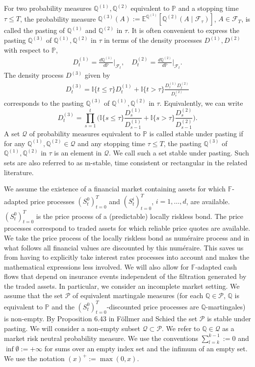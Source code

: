 \documentclass[11pt,a4paper]{article}
\newcommand{\E}{\mathbb{E}}
\renewcommand{\P}{\mathbb{P}}
\newcommand{\Q}{\mathbb{Q}}
\newcommand{\calF}{\mathcal{F}}
\newcommand{\filF}{\mathbb{F}}
\newcommand{\calQ}{\mathcal{Q}}
\newcommand{\indic}{\mathbb{I}}
\begin{document}
For two probability measures $\Q^{(1)},\Q^{(2)}$ equivalent to $\P$ and a stopping time $\tau\leq T$, the probability measure 
$\Q^{(3)}(A):=\E^{\Q^{(1)}}[\Q^{(2)}(A\mid\calF_{\tau})]$, $A\in\calF_T$, is called the pasting of $\Q^{(1)}$ and $\Q^{(2)}$ in $\tau$. 
It is often convenient to express the pasting $\Q^{(3)}$ of $\Q^{(1)},\Q^{(2)}$ in $\tau$ in terms of the density processes $D^{(1)},D^{(2)}$ with respect to $\P$,
\begin{align*}
D^{(1)}_t=\frac{d\Q^{(1)}}{d\P}\Big|_{\calF_t}, \quad D^{(2)}_t=\frac{d\Q^{(2)}}{d\P}\Big|_{\calF_t}.
\end{align*}
The density process $D^{(3)}$ given by 
\begin{align*}
D^{(3)}_t=\indic\{t\leq \tau\}D^{(1)}_t+\indic\{t> \tau\}\frac{D^{(1)}_{\tau}D^{(2)}_t}{D^{(2)}_{\tau}}
\end{align*}
corresponds to the pasting $\Q^{(3)}$ of $\Q^{(1)},\Q^{(2)}$ in $\tau$. Equivalently, we can write
\begin{equation*}
D^{(3)}_t=\prod_{s=1}^t\bigg(\indic\{s\leq \tau\}\frac{D^{(1)}_s}{D^{(1)}_{s-1}}+\indic\{s> \tau\}\frac{D^{(2)}_s}{D^{(2)}_{s-1}}\bigg).
\end{equation*}
A set $\mathcal{Q}$ of probability measures equivalent to $\P$ is called stable under pasting if for any $\Q^{(1)},\Q^{(2)}\in\mathcal{Q}$ and any stopping time $\tau\leq T$, the pasting $\Q^{(3)}$ of $\Q^{(1)},\Q^{(2)}$ in $\tau$ is an element in $\mathcal{Q}$. We call such a set stable under pasting. Such sets are also referred to as m-stable, time consistent or rectangular in the related literature. 

We assume the existence of a financial market containing assets for which $\filF$-adapted price processes $(S^0_t)_{t=0}^T$ and $(S^i_t)_{t=0}^T$, $i=1,\dots,d$, are available. $(S^0_t)_{t=0}^T$ is the price process of a (predictable) locally riskless bond. The price processes correspond to traded assets for which reliable price quotes are available.  
We take the price process of the locally riskless bond as num\'eraire process and in what follows all financial values are discounted by this num\'eraire. This saves us from having to explicitly take interest rates processes into account and makes the mathematical expressions less involved.  
We will also allow for $\filF$-adapted cash flows that depend on insurance events independent of the filtration generated by the traded assets. In particular, we consider an incomplete market setting. 
We assume that the set $\mathcal{P}$ of equivalent martingale measures (for each $\Q\in\mathcal{P}$, $\Q$ is equivalent to $\P$ and the $(S^0_t)_{t=0}^T$-discounted price processes are $\Q$-martingales) is non-empty. By Proposition 6.43 in F\"ollmer and Schied \cite{Foellmer-Schied-16} the set $\mathcal{P}$ is stable under pasting. We will consider a non-empty subset $\mathcal{Q}\subset \mathcal{P}$. We refer to $\Q\in\calQ$ as a market risk neutral probability measure. 
We use the conventions $\sum_{l=k}^{k-1}:=0$ and $\inf\emptyset:=+\infty$ for sums over an empty index set and the infimum of an empty set. We use the notation $(x)^+:=\max(0,x)$.
\end{document}

